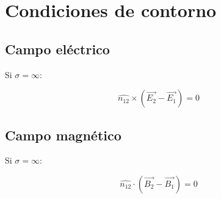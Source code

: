 \documentclass[12pt,a4paper]{article}
\begin{document}
\section{Condiciones de contorno}
\label{sec:condiciones_de_contorno}

\subsection{Campo eléctrico}
\label{sub:campo_electrico}

Si $ \sigma = \infty $:

\[ \hat{n_{12}} \times ( \vec{E_2} - \vec{E_1} ) = 0 \]

\subsection{Campo magnético}
\label{sub:campo_magnetico}

Si $ \sigma = \infty $:

\[ \hat{n_{12}} \cdot ( \vec{B_2} - \vec{B_1} ) = 0 \]
\end{document}

